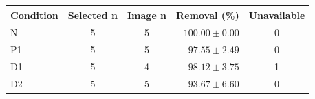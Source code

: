 \begin{tabular}{lccrc}
\toprule
Condition & Selected n & Image n & Removal (\%) & Unavailable \\
\midrule
N & 5 & 5 & $100.00 \pm 0.00$ & 0 \\
P1 & 5 & 5 & $97.55 \pm 2.49$ & 0 \\
D1 & 5 & 4 & $98.12 \pm 3.75$ & 1 \\
D2 & 5 & 5 & $93.67 \pm 6.60$ & 0 \\
\bottomrule
\end{tabular}
